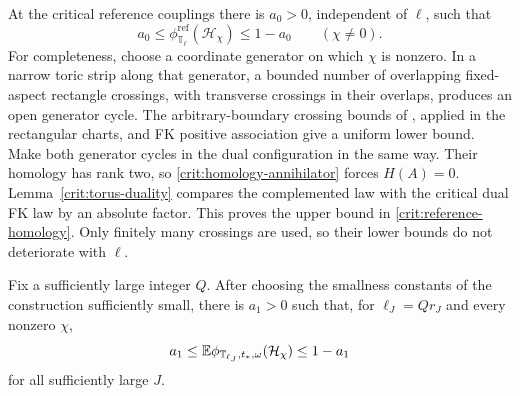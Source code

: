 At the critical reference couplings there is $a_0>0$, independent of
$\ell$, such that
\begin{equation}\label{crit:reference-homology}
 a_0\le\phi^{\mathrm{ref}}_{\mathbb T_\ell}(\mathcal H_\chi)
                    \le1-a_0
 \qquad(\chi\ne0).
\end{equation}
For completeness, choose a coordinate generator on which $\chi$ is
nonzero.  In a narrow toric strip along that generator, a bounded
number of overlapping fixed-aspect rectangle crossings, with transverse
crossings in their overlaps, produces an open generator cycle.
The arbitrary-boundary crossing bounds of
\cite[Theorem~1.1]{CDH2016}, applied in the rectangular charts, and FK
positive association give a uniform lower bound.  Make both generator
cycles in the dual configuration in the same way.  Their homology has
rank two, so \eqref{crit:homology-annihilator} forces $H(A)=0$.
Lemma~\ref{crit:torus-duality} compares the complemented law with the
critical dual FK law by an absolute factor.  This proves the upper
bound in \eqref{crit:reference-homology}.  Only finitely many crossings
are used, so their lower bounds do not deteriorate with $\ell$.

\begin{lemma}\label{crit:torus-transfer}
Fix a sufficiently large integer $Q$.  After choosing the smallness
constants of the construction sufficiently small, there is $a_1>0$
such that, for $\ell_J=Qr_J$ and every nonzero $\chi$,
\begin{equation}\label{crit:tuned-homology}
 a_1\le \mathbb E\phi_{\mathbb T_{\ell_J},t_*,\omega}(\mathcal H_\chi)
                 \le1-a_1
\end{equation}
for all sufficiently large $J$.
\end{lemma}

